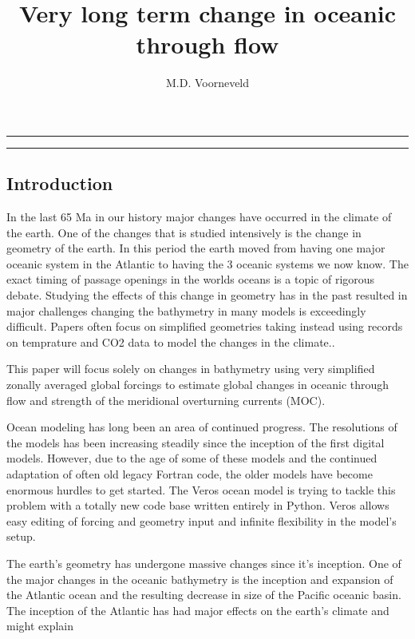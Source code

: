 \documentclass[a4paper]{article}
\title{Very long term change in oceanic through flow}
\author{M.D. Voorneveld}
\begin{document}
\maketitle
\noindent\rule{\textwidth}{1pt}
\begin{abstract}

\end{abstract}
\noindent\rule{\textwidth}{1pt}
\begin{multicols}{2}
\section{Introduction}

In the last 65 Ma in our history major changes have occurred in the climate of the earth. One of the changes that is studied intensively is the change in geometry of the earth. In this period the earth moved from having one major oceanic system in the Atlantic to having the 3 oceanic systems we now know. The exact timing of passage openings in the worlds oceans is a topic of rigorous debate\cite{Scher2006Apr}\cite{Schmidt2007Jan}. Studying the effects of this change in geometry has in the past resulted in major challenges changing the bathymetry in many models is exceedingly difficult. Papers often focus on simplified geometries taking instead using records on temprature and CO2 data to model the changes in the climate.\cite{Tigchelaar2011Mar}.

This paper will focus solely on changes in bathymetry using very simplified zonally averaged global forcings to estimate global changes in oceanic through flow and strength of the meridional overturning currents (MOC).

Ocean modeling has long been an area of continued progress. The resolutions of the models has been increasing steadily since the inception of the first digital models. However, due to the age of some of these models and the continued adaptation of often old legacy Fortran code, the older models have become enormous hurdles to get started. The Veros \cite{Hafner2018Aug} ocean model is trying to tackle this problem with a totally new code base written entirely in Python. Veros allows easy editing of forcing and geometry input and infinite flexibility in the model's setup.

The earth's geometry has undergone massive changes since it's inception. One of the major changes in the oceanic bathymetry is the inception and expansion of the Atlantic ocean and the resulting decrease in size of the Pacific oceanic basin. The inception of the Atlantic has had major effects on the earth's climate and might explain 


\end{multicols}
\end{document}
